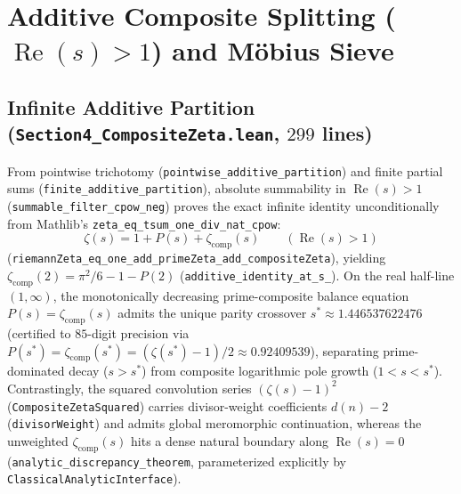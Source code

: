 \documentclass[11pt,a4paper]{article}
\theoremstyle{definition}
\begin{document}
\section{Additive Composite Splitting ($\operatorname{Re}(s) > 1$) and M\"obius Sieve}\label{sec:sections45}

\subsection{Infinite Additive Partition (\texttt{Section4\_\allowbreak CompositeZeta.lean}, $299$ lines)}
From pointwise trichotomy (\texttt{pointwise\_\allowbreak additive\_\allowbreak partition}) and finite partial sums (\texttt{finite\_\allowbreak additive\_\allowbreak partition}), absolute summability in $\operatorname{Re}(s) > 1$ (\texttt{summable\_\allowbreak filter\_\allowbreak cpow\_\allowbreak neg}) proves the exact infinite identity unconditionally from Mathlib's \texttt{zeta\_\allowbreak eq\_\allowbreak tsum\_\allowbreak one\_\allowbreak div\_\allowbreak nat\_\allowbreak cpow}:
\begin{equation}\label{eq:additive_split}
\zeta(s) = 1 + P(s) + \zeta_{\mathrm{comp}}(s) \qquad (\operatorname{Re}(s) > 1)
\end{equation}
(\texttt{riemannZeta\_\allowbreak eq\_\allowbreak one\_\allowbreak add\_\allowbreak primeZeta\_\allowbreak add\_\allowbreak compositeZeta}), yielding $\zeta_{\mathrm{comp}}(2) = \pi^2/6 - 1 - P(2)$ (\texttt{additive\_\allowbreak identity\_\allowbreak at\_\allowbreak s\_}). On the real half-line $(1, \infty)$, the monotonically decreasing prime-composite balance equation $P(s) = \zeta_{\mathrm{comp}}(s)$ admits the unique parity crossover $s^* \approx 1.446537622476$ (certified to $85$-digit precision via $P(s^*) = \zeta_{\mathrm{comp}}(s^*) = (\zeta(s^*) - 1)/2 \approx 0.92409539$), separating prime-dominated decay ($s > s^*$) from composite logarithmic pole growth ($1 < s < s^*$). Contrastingly, the squared convolution series $(\zeta(s) - 1)^2$ (\texttt{CompositeZetaSquared}) carries divisor-weight coefficients $d(n) - 2$ (\texttt{divisorWeight}) and admits global meromorphic continuation, whereas the unweighted $\zeta_{\mathrm{comp}}(s)$ hits a dense natural boundary along $\operatorname{Re}(s) = 0$ (\texttt{analytic\_\allowbreak discrepancy\_\allowbreak theorem}, parameterized explicitly by \texttt{ClassicalAnalyticInterface}).
\end{document}
